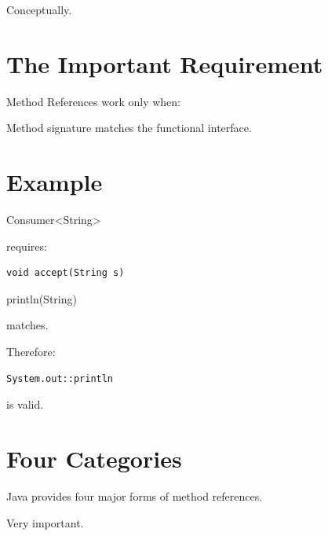 \documentclass[11pt,a4paper]{book}
\begin{document}

Conceptually.


\section{The Important Requirement}

Method References work only when:


Method signature matches
the functional interface.


\section{Example}

Consumer<String>

requires:

\begin{verbatim} 
void accept(String s)
\end{verbatim}


println(String)

matches.


Therefore:

\begin{verbatim} 
System.out::println
\end{verbatim}

is valid.


\section{Four Categories}

Java provides four major
forms of method references.


Very important.

\end{document}
